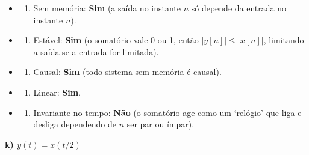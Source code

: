 \begin{itemize}
\tightlist
\item
  \begin{enumerate}
  \def\labelenumi{(\roman{enumi})}
  \tightlist
  \item
    Sem memória: \textbf{Sim} (a saída no instante \(n\) só depende da entrada no instante \(n\)).
  \end{enumerate}
\item
  \begin{enumerate}
  \def\labelenumi{(\roman{enumi})}
  \setcounter{enumi}{1}
  \tightlist
  \item
    Estável: \textbf{Sim} (o somatório vale 0 ou 1, então \(|y[n]| \le |x[n]|\), limitando a saída se a entrada for limitada).
  \end{enumerate}
\item
  \begin{enumerate}
  \def\labelenumi{(\roman{enumi})}
  \setcounter{enumi}{2}
  \tightlist
  \item
    Causal: \textbf{Sim} (todo sistema sem memória é causal).
  \end{enumerate}
\item
  \begin{enumerate}
  \def\labelenumi{(\roman{enumi})}
  \setcounter{enumi}{3}
  \tightlist
  \item
    Linear: \textbf{Sim}.
  \end{enumerate}
\item
  \begin{enumerate}
  \def\labelenumi{(\alph{enumi})}
  \setcounter{enumi}{21}
  \tightlist
  \item
    Invariante no tempo: \textbf{Não} (o somatório age como um `relógio' que liga e desliga dependendo de \(n\) ser par ou ímpar).
  \end{enumerate}
\end{itemize}

\textbf{k) \(y(t) = x(t/2)\)}

